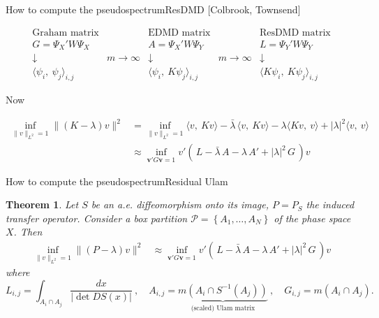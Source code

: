 \documentclass[
  english,            %
  aspectratio=169,    %
]{tumbeamer}
\newtheorem{theorem}{Theorem}
\newcommand{\cP}{\mathcal{P}}
\newcommand{\bv}{\mathbf{v}}
\begin{document}
\begin{frame}{How to compute the pseudospectrum}{ResDMD [Colbrook, Townsend]}
  
\begin{equation}
  \begin{matrix}
    \text{Graham matrix} & & \text{EDMD matrix} & & \text{ResDMD matrix} \\ 
    G = \Psi_X ' W \Psi_X &  &A = \Psi_X ' W \Psi_Y & &  L = \Psi_Y ' W \Psi_Y \\ 
    \downarrow & \scriptstyle{m \to \infty} & \downarrow & \scriptstyle{m \to \infty} & \downarrow \\ 
    \langle \psi_i,\ \psi_j \rangle_{i,j} & & \langle \psi_i,\ K\psi_j \rangle_{i,j} & & \langle K \psi_i,\ K \psi_j \rangle_{i,j}
  \end{matrix}
\end{equation}

Now

\begin{align}
  \inf_{\| v \|_{L^2} = 1} \| (K - \lambda) v \|^2 &= \inf_{\| v \|_{L^2} = 1} 
  \langle v,\ K v \rangle - \bar{\lambda} \,\langle v,\ K v \rangle - \lambda \langle K v,\ v \rangle + |\lambda|^2 \langle v,\ v \rangle \\
  &\approx \inf_{\bv' G \bv = 1} v' (\, L - \bar{\lambda}\, A - \lambda\, A' + |\lambda|^2 \,G \,) v
\end{align}

\end{frame}

\begin{frame}{How to compute the pseudospectrum}{Residual Ulam}

\begin{theorem}
  Let $S$ be an a.e. diffeomorphism onto its image, $P = P_S$ the induced transfer operator. Consider a box partition $\cP = \left\{ A_1, \ldots, A_N \right\}$ of the phase space $X$. Then 
  \begin{align}
    \inf_{\| v \|_{L^2} = 1} \| (P - \lambda) v \|^2 &\approx \inf_{\bv' G \bv = 1} v' (\, L - \bar{\lambda}\, A - \lambda\, A' + |\lambda|^2 \,G \,) v
  \end{align}
  where 
  \begin{equation}
    L_{i,j} = \int_{A_i \cap A_j} \frac{dx}{| \det DS (x) |}
    \ , \quad 
    A_{i,j} = \underbrace{m(A_i \cap S^{-1} (A_j))}_{\text{(scaled) Ulam matrix}}
    \ , \quad 
    G_{i,j} = m(A_i \cap A_j) . 
  \end{equation}
\end{theorem}
\end{frame}
\end{document}

